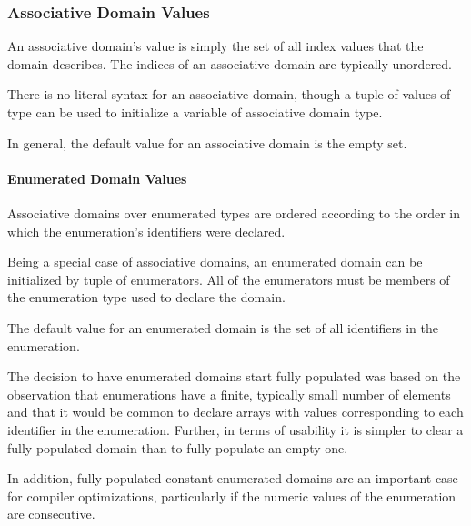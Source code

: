 \subsubsection{Associative Domain Values}
\label{Associative_Domain_Values}

An associative domain's value is simply the set of all index values
that the domain describes.  The indices of an associative domain are
typically unordered.  


There is no literal syntax for an associative domain, though a tuple
of values of type  can be used to initialize a variable
of associative domain type.



In general, the default value for an associative domain is the empty set.

\paragraph{Enumerated Domain Values}

Associative domains over
enumerated types are ordered according to the order in which the
enumeration's identifiers were declared.

Being a special case of associative domains, an enumerated domain can be
initialized by tuple of enumerators.  All of the enumerators must be
members of the enumeration type used to declare the domain.


The default value for an enumerated domain is the set of all identifiers in the
enumeration.

\begin{rationale}
The decision to have enumerated domains start fully populated was
based on the observation that enumerations have a finite, typically
small number of elements and that it would be common to declare arrays
with values corresponding to each identifier in the enumeration.
Further, in terms of usability it is simpler to clear a fully-populated
domain than to fully populate an empty one.

In addition, fully-populated constant enumerated
domains are an important case for compiler optimizations, particularly
if the numeric values of the enumeration are consecutive.
\end{rationale}

